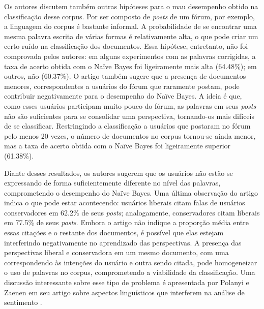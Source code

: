 Os autores discutem também outras hipóteses para o mau desempenho obtido na classificação desse corpus. Por ser composto de \emph{posts} de um fórum, por exemplo, a linguagem do corpus é bastante informal. A probabilidade de se encontrar uma mesma palavra escrita de várias formas é relativamente alta, o que pode criar um certo ruído na classificação dos documentos. Essa hipótese, entretanto, não foi comprovada pelos autores: em alguns experimentos com as palavras corrigidas, a taxa de acerto obtida com o Naïve Bayes foi ligeiramente mais alta (64.48\%); em outros, não (60.37\%). O artigo também sugere que a presença de documentos menores, correspondentes a usuários do fórum que raramente postam, pode contribuir negativamente para o desempenho do Naïve Bayes. A ideia é que, como esses usuários participam muito pouco do fórum, as palavras em seus \emph{posts} não são suficientes para se consolidar uma perspectiva, tornando-os mais difíceis de se classificar. Restringindo a classificação a usuários que postaram no fórum pelo menos 20 vezes, o número de documentos no corpus tornou-se ainda menor, mas a taxa de acerto obtida com o Naïve Bayes foi ligeiramente superior (61.38\%). 

Diante desses resultados, os autores sugerem que os usuários não estão se expressando de forma suficientemente diferente no nível das palavras, comprometendo o desempenho do Naïve Bayes. Uma última observação do artigo indica o que pode estar acontecendo: usuários liberais citam falas de usuários conservadores em 62.2\% de seus \emph{posts}; analogamente, conservadores citam liberais em 77.5\%  de seus \emph{posts}. Embora o artigo não indique a proporção média entre essas citações e o restante dos documentos, é possível que elas estejam interferindo negativamente no aprendizado das perspectivas. A presença das perspectivas liberal e conservadora em um mesmo documento, com uma correspondendo às intenções do usuário e outra sendo citada, pode homogeneizar o uso de palavras no corpus, comprometendo a viabilidade da classificação. Uma discussão interessante sobre esse tipo de problema é apresentada por Polanyi e Zaenen em seu artigo sobre aspectos linguísticos que interferem na análise de sentimento \cite{valence-shifters}.   








